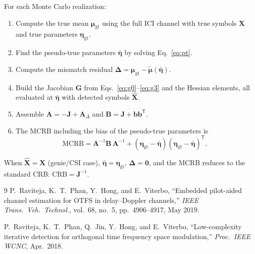 \documentclass[11pt,a4paper]{article}
\newcommand{\bmmu}{\bm{\mu}}
\newcommand{\bmtildemu}{\bm{\tilde{\mu}}}
\newcommand{\bmeta}{\bm{\eta}}
\newcommand{\bmetabar}{\bm{\bar{\eta}}}
\newcommand{\bmX}{\bm{X}}
\newcommand{\bmXhat}{\bm{\hat{X}}}
\begin{document}
For each Monte Carlo realization:
\begin{enumerate}
  \item Compute the true mean $\bmmu_{\mathrm{gt}}$ using the full ICI
    channel with true symbols $\bmX$ and true parameters
    $\bmeta_{\mathrm{gt}}$.
  \item Find the pseudo-true parameters $\bmetabar$ by solving
    Eq.~\eqref{eq:pt}.
  \item Compute the mismatch residual
    $\bm{\Delta} = \bmmu_{\mathrm{gt}} - \bmtildemu(\bmetabar)$.
  \item Build the Jacobian $\bm{G}$ from
    Eqs.~\eqref{eq:g0}--\eqref{eq:g3} and the Hessian elements, all
    evaluated at $\bmetabar$ with detected symbols $\bmXhat$.
  \item Assemble
    $\bm{A} = -\bm{J} + \bm{A}_\Delta$ and
    $\bm{B} = \bm{J} + \bm{b}\bm{b}^{\mathsf T}$.
  \item The MCRB including the bias of the pseudo-true parameters is
    \begin{equation}
      \mathrm{MCRB}
      = \bm{A}^{-1}\bm{B}\,\bm{A}^{-1}
      + (\bmeta_{\mathrm{gt}} - \bmetabar)
        (\bmeta_{\mathrm{gt}} - \bmetabar)^{\mathsf T}.
    \end{equation}
\end{enumerate}
When $\bmXhat = \bmX$ (genie/CSI case), $\bmetabar = \bmeta_{\mathrm{gt}}$,
$\bm{\Delta}=\bm{0}$, and the MCRB reduces to the standard CRB:
$\mathrm{CRB} = \bm{J}^{-1}$.
\begin{thebibliography}{9}
P.~Raviteja, K.~T.~Phan, Y.~Hong, and E.~Viterbo,
``Embedded pilot-aided channel estimation for OTFS in delay--Doppler
channels,'' \emph{IEEE Trans.\ Veh.\ Technol.}, vol.~68, no.~5,
pp.~4906--4917, May 2019.

P.~Raviteja, K.~T.~Phan, Q.~Jin, Y.~Hong, and E.~Viterbo,
``Low-complexity iterative detection for orthogonal time frequency
space modulation,'' \emph{Proc.\ IEEE WCNC}, Apr.\ 2018.
\end{thebibliography}
\end{document}
